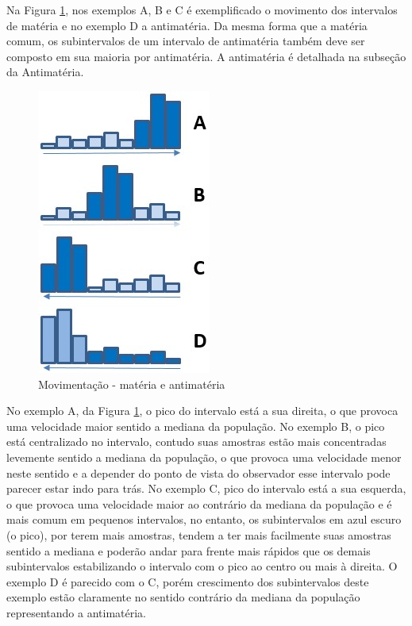 Na Figura \ref{fig:consciousness_space_matter_antimatter}, nos exemplos A, B e C é exemplificado o movimento dos intervalos de matéria e no exemplo D a antimatéria. Da mesma forma que a matéria comum, os subintervalos de um intervalo de antimatéria também deve ser composto em sua maioria por antimatéria. A antimatéria é detalhada na subseção da Antimatéria. 
	\begin{figure}[H]
	\caption{Movimentação - matéria e antimatéria}
	\label{fig:consciousness_space_matter_antimatter}
	\centering
	\includegraphics[scale=.7]{sections/images/consciousness_space_matter_antimatter.jpg}
	\end{figure}

No exemplo A, da Figura \ref{fig:consciousness_space_matter_antimatter}, o pico do intervalo está a sua direita, o que provoca uma velocidade maior sentido a mediana da população. No exemplo B, o pico está centralizado no intervalo, contudo suas amostras estão mais concentradas levemente sentido a mediana da população, o que provoca uma velocidade menor neste sentido e a depender do ponto de vista do observador esse intervalo pode parecer estar indo para trás. No exemplo C, pico do intervalo está a sua esquerda, o que provoca uma velocidade maior ao contrário da mediana da população e é mais comum em pequenos intervalos, no entanto, os subintervalos em azul escuro (o pico), por terem mais amostras, tendem a ter mais facilmente suas amostras sentido a mediana e poderão andar para frente mais rápidos que os demais subintervalos estabilizando o intervalo com o pico ao centro ou mais à direita. O exemplo D é parecido com o C, porém crescimento dos subintervalos deste exemplo estão claramente no sentido contrário da mediana da população representando a antimatéria.
	
